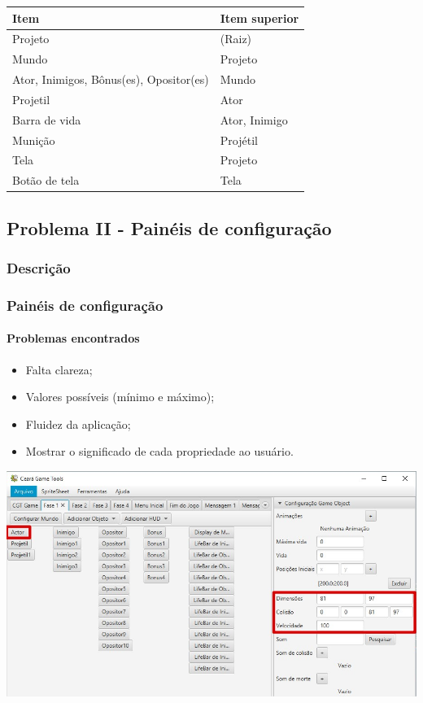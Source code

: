\documentclass[]{beamer}
\begin{document}
   \begin{frame}
      \begin{center}
         \begin{tabular}{| p{8cm} | l | }
            \hline
            \textbf{Item} & \textbf{Item superior} \\
            \hline
            Projeto & (Raiz) \\
            Mundo & Projeto \\
            Ator, Inimigos, Bônus(es), Opositor(es) & Mundo \\
            Projetil & Ator \\
            Barra de vida & Ator, Inimigo \\
            Munição & Projétil \\
            Tela & Projeto \\
            Botão de tela & Tela \\
            \hline
         \end{tabular}
      \end{center}
   \end{frame}

   \subsection{Problema II - Painéis de configuração}
   \subsubsection{Descrição}
   \begin{frame}
      \frametitle{Painéis de configuração}
      \framesubtitle{Problemas encontrados}
      \begin{itemize}
         \item Falta clareza;
         \item Valores possíveis (mínimo e máximo);
         \item Fluidez da aplicação;
         \item Mostrar o significado de cada propriedade ao usuário.
      \end{itemize}
   \end{frame}

   \begin{frame}
      \includegraphics[width=\textwidth]{images/obj_dimensoes.jpg}
   \end{frame}
\end{document}
